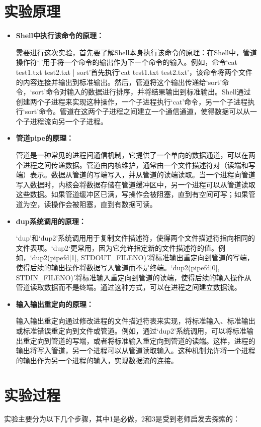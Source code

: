 \documentclass{LabReport}
\begin{document}
	\section{实验原理}
	\begin{itemize}
		\item \textbf{Shell中执行该命令的原理：}
		
		需要进行这次实验，首先要了解Shell本身执行该命令的原理：在Shell中，管道操作符`|'用于将一个命令的输出作为下一个命令的输入。例如，命令`cat test1.txt test2.txt | sort'首先执行`cat test1.txt test2.txt'，该命令将两个文件的内容连接并输出到标准输出。然后，管道将这个输出传递给`sort'命令，`sort'命令对输入的数据进行排序，并将结果输出到标准输出。Shell通过创建两个子进程来实现这种操作，一个子进程执行`cat'命令，另一个子进程执行`sort'命令。管道在这两个子进程之间建立一个通信通道，使得数据可以从一个子进程流向另一个子进程。
		
		\item \textbf{管道pipe的原理：}
		
		管道是一种常见的进程间通信机制，它提供了一个单向的数据通道，可以在两个进程之间传递数据。管道由内核维护，通常由一个文件描述符对（读端和写端）表示。数据从管道的写端写入，并从管道的读端读取。当一个进程向管道写入数据时，内核会将数据存储在管道缓冲区中，另一个进程可以从管道读取这些数据。如果管道缓冲区已满，写操作会被阻塞，直到有空间可写；如果管道为空，读操作会被阻塞，直到有数据可读。
		
		\item \textbf{dup系统调用的原理：}
		
		`dup'和`dup2'系统调用用于复制文件描述符，使得两个文件描述符指向相同的文件表项。`dup2`更常用，因为它允许指定新的文件描述符的值。例如，`dup2(pipefd[1], STDOUT\_FILENO)'将标准输出重定向到管道的写端，使得后续的输出操作将数据写入管道而不是终端。`dup2(pipefd[0], STDIN\_FILENO)'将标准输入重定向到管道的读端，使得后续的输入操作从管道读取数据而不是终端。通过这种方式，可以在进程之间建立数据流。
		
		\item \textbf{输入输出重定向的原理：}
		
		输入输出重定向通过修改进程的文件描述符表来实现，将标准输入、标准输出或标准错误重定向到文件或管道。例如，通过`dup2'系统调用，可以将标准输出重定向到管道的写端，或者将标准输入重定向到管道的读端。这样，进程的输出将写入管道，另一个进程可以从管道读取输入。这种机制允许将一个进程的输出作为另一个进程的输入，实现数据流的连接。
	\end{itemize}
	
	\section{实验过程}
	\par\hspace{0em}实验主要分为以下几个步骤，其中1是必做，2和3是受到老师启发去探索的：
	
\end{document}
